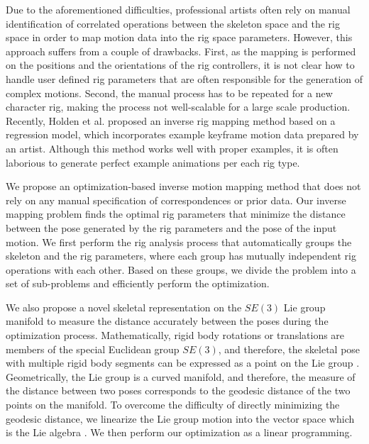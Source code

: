 Due to the aforementioned difficulties, professional artists often rely on manual identification of correlated operations between the skeleton space and the rig space in order to map motion data into the rig space parameters\cite{palamar2013mastering,DigitalTutor2013}. 
However, this approach suffers from a couple of drawbacks. 
First, as the mapping is performed on the positions and the orientations of the rig controllers, it is not clear how to handle user defined rig parameters that are often responsible for the generation of complex motions. 
Second, the manual process has to be repeated for a new character rig, making the process not well-scalable for a large scale production. 
Recently, Holden et al. proposed an inverse rig mapping method based on a regression model, which incorporates example keyframe motion data prepared by an artist. 
Although this method works well with proper examples, it is often laborious to generate perfect example animations per each rig type.

We propose an optimization-based inverse motion mapping method that does not rely on any manual specification of correspondences or prior data. 
Our inverse mapping problem finds the optimal rig parameters that minimize the distance between the pose generated by the rig parameters and the pose of the input motion. 
We first perform the rig analysis process that automatically groups the skeleton and the rig parameters, where each group has mutually independent rig operations with each other. 
Based on these groups, we divide the problem into a set of sub-problems and efficiently perform the optimization.

We also propose a novel skeletal representation on the $SE(3)$ Lie group manifold to measure the distance accurately between the poses during the optimization process. 
Mathematically, rigid body rotations or translations are members of the special Euclidean group $SE(3)$\cite{murray1994mathematical}, and therefore, the skeletal pose with multiple rigid body segments can be expressed as a point on the Lie group \SE. 
Geometrically, the Lie group \SE{} is a curved manifold, and therefore, the measure of the distance between two poses corresponds to the geodesic distance of the two points on the manifold. 
To overcome the difficulty of directly minimizing the geodesic distance, we linearize the Lie group \SE{} motion into the vector space which is the Lie algebra \se{}. We then perform our optimization as a linear programming.

